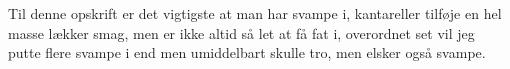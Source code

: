 \documentclass{book}
\begin{document}
Til denne opskrift er det vigtigste at man har svampe i, kantareller tilføje en hel masse lækker smag, men er ikke altid så let at få fat i, overordnet set vil jeg putte flere svampe i end men umiddelbart skulle tro, men elsker også svampe.
\newpage {}
\end{document}
